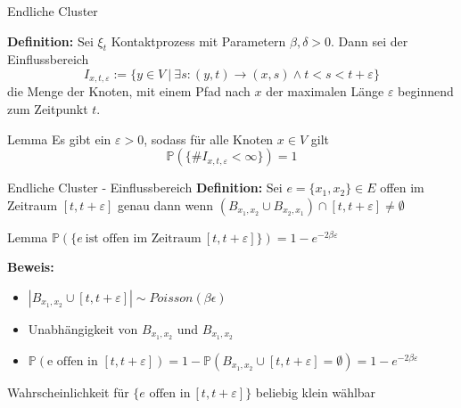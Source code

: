 \documentclass[11pt]{beamer}
\begin{document}
\begin{frame}{Endliche Cluster}
    
    \textbf{Definition:}
    Sei $\xi_t$ Kontaktprozess mit Parametern $\beta, \delta > 0$.
    Dann sei der Einflussbereich
    \begin{equation*}
        I_{x, t, \varepsilon} := \{y \in V\ |\ \exists s : (y, t) \to (x, s) \wedge t < s < t + \varepsilon \} 
        \end{equation*}
    die Menge der Knoten, mit einem Pfad nach $x$ der maximalen Länge
    $\varepsilon$ beginnend zum Zeitpunkt $t$. 
    \begin{block}{Lemma}
        Es gibt ein $\varepsilon > 0$, sodass für alle Knoten $x \in V$ gilt
        \begin{equation*}
            \mathbb{P}(\{ \#I_{x, t, \varepsilon} < \infty \}) = 1
        \end{equation*}
    \end{block}
\end{frame}

\begin{frame}{Endliche Cluster - Einflussbereich}
    \textbf{Definition:}
    Sei $e = \{x_1, x_2\} \in E$ offen im Zeitraum $[t, t + \varepsilon]$
    genau dann wenn $(B_{x_1, x_2} \cup B_{x_2, x_1}) \cap [t, t + \varepsilon] \not= \emptyset$
    
    \begin{block}{Lemma}
        $\mathbb{P}(\{ e\ \text{ist offen im Zeitraum}\ [t, t + \varepsilon] \}) = 1 - e^{-2\beta\varepsilon}$
    \end{block}
    \textbf{Beweis:}
    \begin{itemize}
        \item $|B_{x_1,x_2}\cup [t, t+\varepsilon]| \sim Poisson(\beta\epsilon)$
        \item Unabhängigkeit von $B_{x_1,x_2}$ und $B_{x_1,x_2}$
        \item $\mathbb{P}(\text{e offen in } [t, t + \varepsilon]) = 1 - \mathbb{P}(B_{x_1,x_2}\cup [t, t+\varepsilon] = \emptyset)= 1 - e^{-2\beta\varepsilon}$
    \end{itemize}
    Wahrscheinlichkeit für $\{ e \text{ offen in}\ [t, t + \varepsilon] \} $ beliebig klein wählbar
\end{frame}
\end{document}
